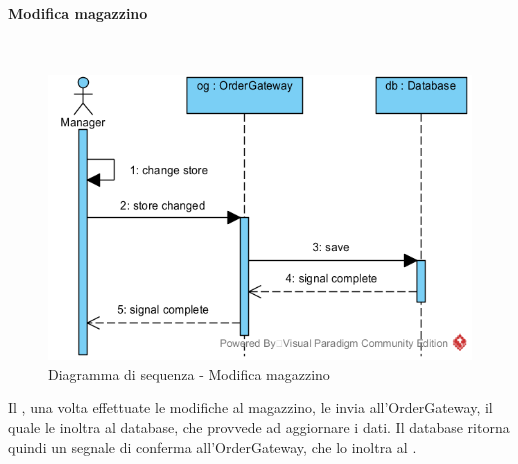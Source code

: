 \begin{samepage}
\paragraph{Modifica magazzino}\mbox{}\\
\end{samepage}
\begin{figure}[H]
	\centering
	\includegraphics[width=14cm]{../../documenti/SpecificaTecnica/diagrammi_img/sequenza/direttore_modifica_magazzino.png}
	\caption{Diagramma di sequenza - Modifica magazzino}
\end{figure}
Il \Manager{}, una volta effettuate le modifiche al magazzino, le invia all'Order\-Gateway, il quale le inoltra al database, che provvede ad aggiornare i dati. Il database ritorna quindi un segnale di conferma all'Order\-Gateway, che lo inoltra al \Manager{}.

